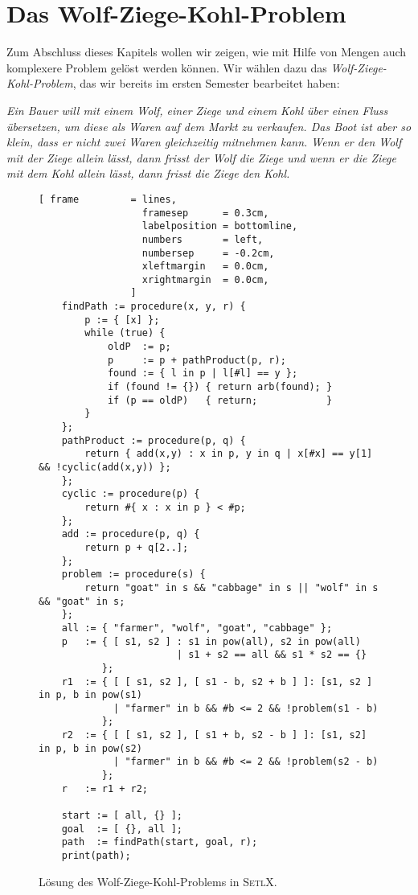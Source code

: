 \section{Das Wolf-Ziege-Kohl-Problem}
Zum Abschluss dieses Kapitels wollen wir zeigen, wie mit Hilfe von Mengen auch komplexere
Problem gel\"ost werden k\"onnen.  Wir w\"ahlen dazu das \emph{Wolf-Ziege-Kohl-Problem}, das wir
bereits im ersten Semester  bearbeitet haben:
\vspace*{0.3cm}

\begin{minipage}[c]{14cm}
{\sl
Ein Bauer will mit einem Wolf, einer Ziege und einem Kohl \"uber einen Fluss \"ubersetzen, um
diese als Waren auf dem Markt zu verkaufen.
Das Boot ist aber so klein, dass er nicht zwei Waren gleichzeitig mitnehmen kann.
Wenn er den Wolf mit der Ziege allein l\"asst, dann frisst der Wolf die Ziege und wenn er die
Ziege mit dem Kohl allein l\"asst, dann frisst die Ziege den Kohl. }
\end{minipage}
\vspace*{0.3cm}


\begin{figure}[!h]
\centering
\begin{Verbatim}[ frame         = lines, 
                  framesep      = 0.3cm, 
                  labelposition = bottomline,
                  numbers       = left,
                  numbersep     = -0.2cm,
                  xleftmargin   = 0.0cm,
                  xrightmargin  = 0.0cm,
                ]
    findPath := procedure(x, y, r) {
        p := { [x] };
        while (true) {
            oldP  := p;
            p     := p + pathProduct(p, r);
            found := { l in p | l[#l] == y };
            if (found != {}) { return arb(found); }
            if (p == oldP)   { return;            }
        }
    };
    pathProduct := procedure(p, q) {
        return { add(x,y) : x in p, y in q | x[#x] == y[1] && !cyclic(add(x,y)) };
    };
    cyclic := procedure(p) { 
        return #{ x : x in p } < #p;
    };
    add := procedure(p, q) {
        return p + q[2..];
    };
    problem := procedure(s) {
        return "goat" in s && "cabbage" in s || "wolf" in s && "goat" in s;
    };   
    all := { "farmer", "wolf", "goat", "cabbage" };
    p   := { [ s1, s2 ] : s1 in pow(all), s2 in pow(all) 
                        | s1 + s2 == all && s1 * s2 == {} 
           };
    r1  := { [ [ s1, s2 ], [ s1 - b, s2 + b ] ]: [s1, s2 ] in p, b in pow(s1) 
             | "farmer" in b && #b <= 2 && !problem(s1 - b) 
           };
    r2  := { [ [ s1, s2 ], [ s1 + b, s2 - b ] ]: [s1, s2] in p, b in pow(s2) 
             | "farmer" in b && #b <= 2 && !problem(s2 - b)
           };
    r   := r1 + r2;
    
    start := [ all, {} ];
    goal  := [ {}, all ];
    path  := findPath(start, goal, r);
    print(path);
\end{Verbatim}
\vspace*{-0.3cm}
\caption{L\"osung des Wolf-Ziege-Kohl-Problems in \textsc{SetlX}.}
\label{fig:wolf-ziege-kohl.stlx}
\end{figure}

